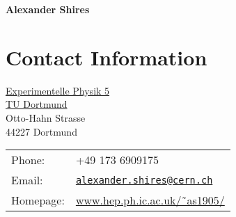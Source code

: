 \documentclass[10pt]{article}
\def\name{Alexander Shires}
\providecommand*\email[1]{\href{mailto:#1}{#1}}
\renewcommand*\email[1]{\href{mailto:#1}{\texttt{#1}}}
\begin{document}

\centerline{\Large \bf \name}

\section*{Contact Information}

\begin{minipage}{0.50\linewidth}
  \href{http://e5.physik.uni-dortmund.de}{Experimentelle Physik 5} \\
  \href{http://www.uni-dortmund.de}{TU Dortmund} \\
  Otto-Hahn Strasse \\
  44227 Dortmund 
\end{minipage}
\begin{minipage}{0.50\linewidth}
  \begin{tabular}{ll}
    Phone: & +49 173 6909175 \\
    Email: & \email{alexander.shires@cern.ch}\\
    Homepage: & \href{http://www.hep.ph.ic.ac.uk/~as1905/}{www.hep.ph.ic.ac.uk/\~\ as1905/} \\
  \end{tabular}
\end{minipage}

\end{document}
